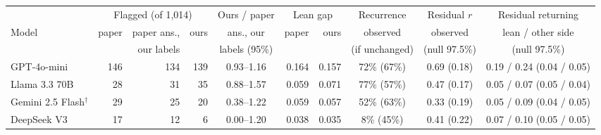 \begin{tabular}{lrrrcrrccc}
\toprule
& \multicolumn{3}{c}{Flagged (of 1,014)} & Ours / paper & \multicolumn{2}{c}{Lean gap} & Recurrence & Residual $r$ & Residual returning\\
Model & paper & paper ans., & ours & ans., our & paper & ours & observed & observed & lean / other side\\
& & our labels & & labels (95\%) & & & (if unchanged) & (null 97.5\%) & (null 97.5\%)\\
\midrule
GPT-4o-mini & 146 & 134 & 139 & 0.93--1.16 & 0.164 & 0.157 & 72\% (67\%) & 0.69 (0.18) & 0.19 / 0.24 (0.04 / 0.05)\\
Llama 3.3 70B & 28 & 31 & 35 & 0.88--1.57 & 0.059 & 0.071 & 77\% (57\%) & 0.47 (0.17) & 0.05 / 0.07 (0.05 / 0.04)\\
Gemini 2.5 Flash$^\dagger$ & 29 & 25 & 20 & 0.38--1.22 & 0.059 & 0.057 & 52\% (63\%) & 0.33 (0.19) & 0.05 / 0.09 (0.04 / 0.05)\\
DeepSeek V3 & 17 & 12 & 6 & 0.00--1.20 & 0.038 & 0.035 & 8\% (45\%) & 0.41 (0.22) & 0.07 / 0.10 (0.05 / 0.05)\\
\bottomrule
\end{tabular}
